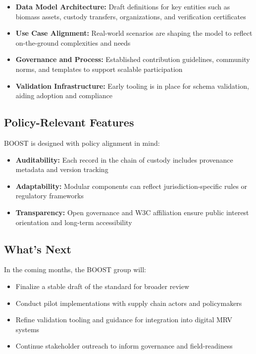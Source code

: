 \documentclass[title=small,preset=opensansnote,par=skip]{article}
\begin{document}
\begin{itemize}
\item \textbf{Data Model Architecture:} Draft definitions for key entities such as biomass assets, custody transfers, organizations, and verification certificates

\item \textbf{Use Case Alignment:} Real-world scenarios are shaping the model to reflect on-the-ground complexities and needs

\item \textbf{Governance and Process:} Established contribution guidelines, community norms, and templates to support scalable participation

\item \textbf{Validation Infrastructure:} Early tooling is in place for schema validation, aiding adoption and compliance
\end{itemize}
\subsection{Policy-Relevant Features}
\label{policy-relevant-features}
BOOST is designed with policy alignment in mind:

\begin{itemize}
\item \textbf{Auditability:} Each record in the chain of custody includes provenance metadata and version tracking

\item \textbf{Adaptability:} Modular components can reflect jurisdiction-specific rules or regulatory frameworks

\item \textbf{Transparency:} Open governance and W3C affiliation ensure public interest orientation and long-term accessibility
\end{itemize}
\subsection{What's Next}
\label{whats-next}
In the coming months, the BOOST group will:

\begin{itemize}
\item Finalize a stable draft of the standard for broader review

\item Conduct pilot implementations with supply chain actors and policymakers

\item Refine validation tooling and guidance for integration into digital MRV systems

\item Continue stakeholder outreach to inform governance and field-readiness
\end{itemize}
\end{document}
